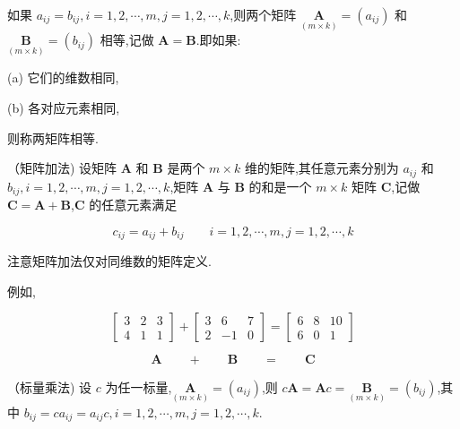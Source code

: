  \quad 如果 $a_{ij} = b_{ij} ,i=1,2,\cdots ,m,j=1,2,\cdots ,k$,则两个矩阵 $\underset{(m \times k)}{\bm{A}} = (a_{ij})$ 和 $\underset{(m \times k)}{\bm{B}} = (b_{ij})$ 相等,记做 $\bm{A} = \bm{B}$.即如果:

(a) 它们的维数相同,

(b) 各对应元素相同,

则称两矩阵相等.

 \quad （矩阵加法) \quad 设矩阵 $\bm{A}$ 和 $\bm{B}$ 是两个 $m \times k$ 维的矩阵,其任意元素分别为 $a_{ij}$ 和 $b_{ij} ,i=1,2,\cdots ,m,j=1,2,\cdots ,k$,矩阵 $\bm{A}$ 与 $\bm{B}$ 的和是一个 $m \times k$ 矩阵 $\bm{C}$,记做 $\bm{C} = \bm{A} + \bm{B}$,$\bm{C}$ 的任意元素满足

\[
c_{ij} = a_{ij} + b_{ij} \qquad i=1,2,\cdots ,m,j=1,2,\cdots ,k
\]

注意矩阵加法仅对同维数的矩阵定义.

例如,

\[
\begin{bmatrix} 3 & 2 & 3 \\ 4 & 1 & 1 \end{bmatrix} + \begin{bmatrix} 3 & 6 & 7 \\ 2 & -1 & 0 \end{bmatrix} = \begin{bmatrix} 6 & 8 & 10 \\ 6 & 0 & 1 \end{bmatrix}
\]

\[
\underset{}{\bm{A}} \qquad + \qquad \underset{}{\bm{B}} \qquad = \qquad \underset{}{\bm{C}}
\]

 \quad （标量乘法) \quad 设 $c$ 为任一标量,$\underset{(m \times k)}{\bm{A}} = (a_{ij})$,则 $c\bm{A} = \bm{A}c = \underset{(m \times k)}{\bm{B}} = (b_{ij})$,其中 $b_{ij} = c a_{ij} = a_{ij} c ,i=1,2,\cdots ,m,j=1,2,\cdots ,k$.
